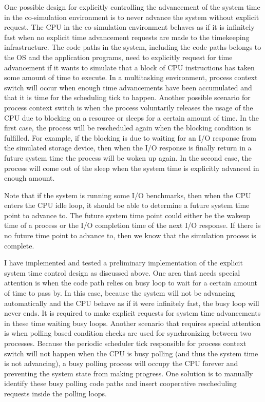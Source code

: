 One possible design for explicitly controlling the advancement of the system time in the co-simulation environment is to never advance the system without explicit request. The CPU in the co-simulation environment behaves as if it is infinitely fast when no explicit time advancement requests are made to the timekeeping infrastructure. The code paths in the system, including the code paths belongs to the OS and the application programs, need to explicitly request for time advancement if it wants to simulate that a block of CPU instructions has taken some amount of time to execute. In a multitasking environment, process context switch will occur when enough time advancements have been accumulated and that it is time for the scheduling tick to happen. Another possible scenario for process context switch is when the process voluntarily releases the usage of the CPU due to blocking on a resource or sleeps for a certain amount of time. In the first case, the process will be rescheduled again when the blocking condition is fulfilled. For example, if the blocking is due to waiting for an I/O response from the simulated storage device, then when the I/O response is finally return in a future system time the process will be woken up again. In the second case, the process will come out of the sleep when the system time is explicitly advanced in enough amount. 

Note that if the system is running some I/O benchmarks, then when the CPU enters the CPU idle loop, it should be able to determine a future system time point to advance to. The future system time point could either be the wakeup time of a process or the I/O completion time of the next I/O response. If there is no future time point to advance to, then we know that the simulation process is complete.

I have implemented and tested a preliminary implementation of the explicit system time control design as discussed above. One area that needs special attention is when the code path relies on busy loop to wait for a certain amount of time to pass by. In this case, because the system will not be advancing automatically and the CPU behave as if it were infinitely fast, the busy loop will never ends. It is required to make explicit requests for system time advancements in these time waiting busy loops. Another scenario that requires special attention is when polling based condition checks are used for synchronizing between two processes. Because the periodic scheduler tick responsible for process context switch will not happen when the CPU is busy polling (and thus the system time is not advancing), a busy polling process will occupy the CPU forever and preventing the system state from making progress. One solution is to manually identify these busy polling code paths and insert cooperative rescheduling requests inside the polling loops.
